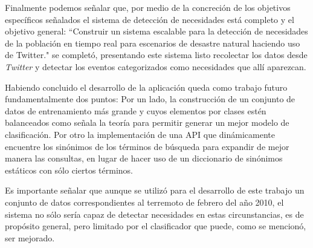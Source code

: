 Finalmente podemos señalar que, por medio de la concreción de los objetivos específicos señalados el sistema de detección de necesidades está completo y el objetivo general: ``Construir un sistema escalable para la detección de necesidades de la población en tiempo real para escenarios de desastre natural haciendo uso de Twitter." se completó, presentando este sistema listo recolectar los datos desde \textit{Twitter} y detectar los eventos categorizados como necesidades que allí aparezcan.

Habiendo concluido el desarrollo de la aplicación queda como trabajo futuro fundamentalmente dos puntos: Por un lado, la construcción de un conjunto de datos de entrenamiento más grande y cuyos elementos por clases estén balanceados como señala la teoría para permitir generar un mejor modelo de clasificación. Por otro la implementación de una API que dinámicamente encuentre los sinónimos de los términos de búsqueda para expandir de mejor manera las consultas, en lugar de hacer uso de un diccionario de sinónimos estáticos con sólo ciertos términos.

Es importante señalar que aunque se utilizó para el desarrollo de este trabajo un conjunto de datos correspondientes al terremoto de febrero del año 2010, el sistema no sólo sería capaz de detectar necesidades en estas circunstancias, es de propósito general, pero limitado por el clasificador que puede, como se mencionó, ser mejorado.

	





